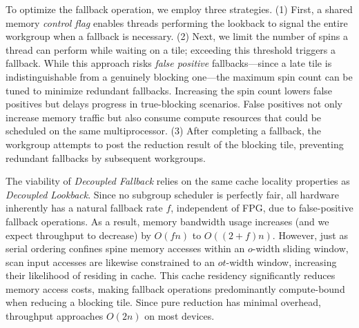 \documentclass[sigconf,screen]{acmart}
\begin{document}
To optimize the fallback operation, we employ three strategies. (1) First, a shared memory \emph{control flag} enables threads performing the lookback to signal the entire workgroup when a fallback is necessary. (2) Next, we limit the number of spins a thread can perform while waiting on a tile; exceeding this threshold triggers a fallback. While this approach risks \emph{false positive} fallbacks---since a late tile is indistinguishable from a genuinely blocking one---the maximum spin count can be tuned to minimize redundant fallbacks. Increasing the spin count lowers false positives but delays progress in true-blocking scenarios. False positives not only increase memory traffic but also consume compute resources that could be scheduled on the same multiprocessor. (3) After completing a fallback, the workgroup attempts to post the reduction result of the blocking tile, preventing redundant fallbacks by subsequent workgroups.

The viability of \emph{Decoupled Fallback} relies on the same cache locality properties as \emph{Decoupled Lookback}. Since no subgroup scheduler is perfectly fair, all hardware inherently has a natural fallback rate $f$\!, independent of FPG, due to false-positive fallback operations. As a result, memory bandwidth usage increases (and we expect throughput to decrease) by $O(fn)$ to $O((2 + f)n)$. However, just as serial ordering confines spine memory accesses within an $o$-width sliding window, scan input accesses are likewise constrained to an $ot$-width window, increasing their likelihood of residing in cache. This cache residency significantly reduces memory access costs, making fallback operations predominantly compute-bound when reducing a blocking tile. Since pure reduction has minimal overhead, throughput approaches $O(2n)$ on most devices.
\end{document}
